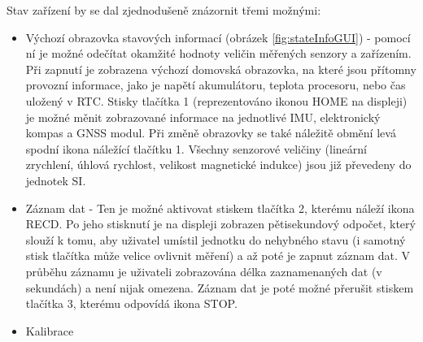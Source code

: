 Stav zařízení by se dal zjednodušeně znázornit třemi možnými:
\begin{itemize}
\item Výchozí obrazovka stavových informací (obrázek \ref{fig:stateInfoGUI}) - pomocí ní je možné odečítat okamžité hodnoty veličin měřených senzory a zařízením. Při zapnutí je zobrazena výchozí domovská obrazovka, na které jsou přítomny provozní informace, jako je napětí akumulátoru, teplota procesoru, nebo čas uložený v RTC. Stisky tlačítka 1 (reprezentováno ikonou HOME na displeji) je možné měnit zobrazované informace na jednotlivé IMU, elektronický kompas a GNSS modul. Při změně obrazovky se také náležitě obmění levá spodní ikona náležící tlačítku 1. Všechny senzorové veličiny (lineární zrychlení, úhlová rychlost, velikost magnetické indukce) jsou již převedeny do jednotek SI.
\item Záznam dat - Ten je možné aktivovat stiskem tlačítka 2, kterému náleží ikona RECD. Po jeho stisknutí je na displeji zobrazen pětisekundový odpočet, který slouží k tomu, aby uživatel umístil jednotku do nehybného stavu (i samotný stisk tlačítka může velice ovlivnit měření) a až poté je zapnut záznam dat. V průběhu záznamu je uživateli zobrazována délka zaznamenaných dat (v sekundách) a není nijak omezena. Záznam dat je poté možné přerušit stiskem tlačítka 3, kterému odpovídá ikona STOP.
\item Kalibrace
\end{itemize}

